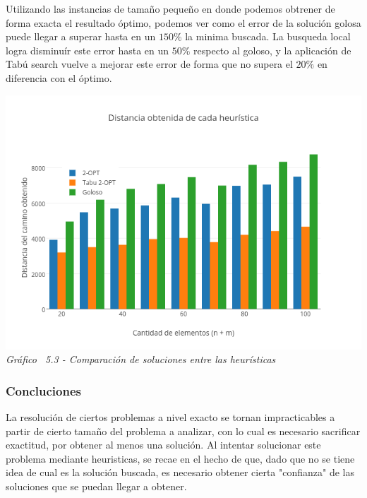 Utilizando las instancias de tamaño pequeño en donde podemos obtrener de forma exacta el resultado óptimo, podemos ver como el error de la solución golosa puede llegar a superar hasta en un $150\%$ la minima buscada. La busqueda local logra disminuír este error hasta en un $50\%$ respecto al goloso, y la aplicación de Tabú search vuelve a mejorar este error de forma que no supera el $20\%$ en diferencia con el óptimo.


\vspace*{0.3cm} \vspace*{0.3cm}
  \begin{center}
 \includegraphics[scale=0.5]{./EJ5/comparativo1.png}\\
 {\textit{Gráfico \ 5.3 - Comparaci\'on de soluciones entre las heur\'isticas}}
  \end{center}
  \vspace*{0.3cm}




\subsubsection{Concluciones}

La resolución de ciertos problemas a nivel exacto se tornan impracticables a partir de cierto tamaño del problema a analizar, con lo cual es necesario sacrificar exactitud, por obtener al menos una solución. Al intentar solucionar este problema mediante heuristicas, se recae en el hecho de que, dado que no se tiene idea de cual es la solución buscada, es necesario obtener cierta "confianza" de las soluciones que se puedan llegar a obtener.

